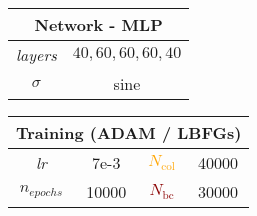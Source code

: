 \documentclass[varwidth=10.5cm,border=2mm]{standalone}
\begin{document}
    \begin{center}
        \begin{table}[htbp]
            \centering
            \begin{tabular}{cc}
                \toprule
                \multicolumn{2}{c}{\textbf{Network - MLP}} \\
                \midrule
                \textit{layers} & $40,60,60,60,40$ \\
                \cmidrule(lr){1-2}
                $\sigma$ & sine \\
                \bottomrule
            \end{tabular}
            \hspace{0.1cm}
            \begin{tabular}{cccc}
                \toprule
                \multicolumn{4}{c}{\textbf{Training} (ADAM / LBFGs)} \\
                \midrule
                \textit{lr} & 7e-3 & \textcolor{orange}{$N_\text{col}$} & 40000 \\
                \cmidrule(lr){1-2} \cmidrule(lr){3-4}
                $n_{epochs}$ & 10000 & \textcolor{darkred}{$N_\text{bc}$} & 30000 \\
                \bottomrule
            \end{tabular}
        \end{table}
    \end{center}
\end{document}
